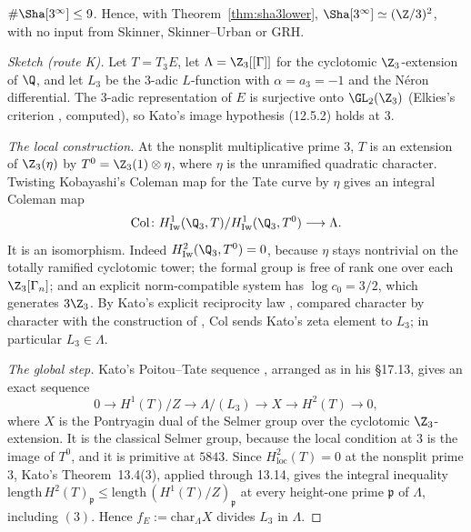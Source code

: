 \begin{theorem}\label{thm:routek}
$\#\Sha[3^\infty]\le9$. Hence, with Theorem~\ref{thm:sha3lower}, $\Sha[3^\infty]\simeq(\Z/3)^2$, with no input from Skinner, Skinner--Urban or GRH.
\end{theorem}
\begin{proof}[Sketch (route K)]
Let $T=T_3E$, let $\Lambda=\Z_3[[\Gamma]]$ for the cyclotomic $\Z_3$-extension of $\Q$, and let $L_3$ be the $3$-adic $L$-function with $\alpha=a_3=-1$ and the N\'eron differential. The $3$-adic representation of $E$ is surjective onto $\GL_2(\Z_3)$ (Elkies's criterion \cite{elkies3}, computed), so Kato's image hypothesis (12.5.2) holds at $3$.

\emph{The local construction.} At the nonsplit multiplicative prime $3$, $T$ is an extension of $\Z_3(\eta)$ by $T^0=\Z_3(1)\otimes\eta$, where $\eta$ is the unramified quadratic character. Twisting Kobayashi's Coleman map for the Tate curve \cite{kobayashi06} by $\eta$ gives an integral Coleman map
\[
\mathrm{Col}\colon H^1_{\mathrm{Iw}}(\Q_3,T)/H^1_{\mathrm{Iw}}(\Q_3,T^0)\longrightarrow\Lambda .
\]
It is an isomorphism. Indeed $H^2_{\mathrm{Iw}}(\Q_3,T^0)=0$, because $\eta$ stays nontrivial on the totally ramified cyclotomic tower; the formal group is free of rank one over each $\Z_3[\Gamma_n]$; and an explicit norm-compatible system has $\log c_0=3/2$, which generates $3\Z_3$. By Kato's explicit reciprocity law \cite[12.5(1)]{kato}, compared character by character with the construction of \cite[\S3.2]{sw}, $\mathrm{Col}$ sends Kato's zeta element to $L_3$; in particular $L_3\in\Lambda$.

\emph{The global step.} Kato's Poitou--Tate sequence \cite[14.9.3 and 17.10]{kato}, arranged as in his \S17.13, gives an exact sequence
\[
0\to H^1(T)/Z\to\Lambda/(L_3)\to X\to H^2(T)\to0 ,
\]
where $X$ is the Pontryagin dual of the Selmer group over the cyclotomic $\Z_3$-extension. It is the classical Selmer group, because the local condition at $3$ is the image of $T^0$, and it is primitive at $5843$. Since $H^2_{\mathrm{loc}}(T)=0$ at the nonsplit prime $3$, Kato's Theorem~13.4(3), applied through 13.14, gives the integral inequality $\mathrm{length}\,H^2(T)_{\mathfrak p}\le\mathrm{length}\,(H^1(T)/Z)_{\mathfrak p}$ at every height-one prime $\mathfrak p$ of $\Lambda$, including $(3)$. Hence $f_E:=\mathrm{char}_\Lambda X$ divides $L_3$ in $\Lambda$.


\end{proof}

